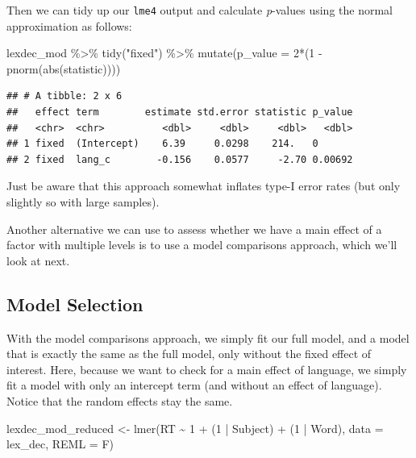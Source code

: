 \documentclass[
]{book}
\newenvironment{Shaded}{\begin{snugshade}}{\end{snugshade}}
\newcommand{\AttributeTok}[1]{\textcolor[rgb]{0.77,0.63,0.00}{#1}}
\newcommand{\DecValTok}[1]{\textcolor[rgb]{0.00,0.00,0.81}{#1}}
\newcommand{\FunctionTok}[1]{\textcolor[rgb]{0.00,0.00,0.00}{#1}}
\newcommand{\NormalTok}[1]{#1}
\newcommand{\OtherTok}[1]{\textcolor[rgb]{0.56,0.35,0.01}{#1}}
\newcommand{\SpecialCharTok}[1]{\textcolor[rgb]{0.00,0.00,0.00}{#1}}
\newcommand{\StringTok}[1]{\textcolor[rgb]{0.31,0.60,0.02}{#1}}
\begin{document}
Then we can tidy up our \texttt{lme4} output and calculate \emph{p}-values using the normal approximation as follows:

\begin{Shaded}
\begin{Highlighting}[]
\NormalTok{lexdec\_mod }\SpecialCharTok{\%\textgreater{}\%} 
  \FunctionTok{tidy}\NormalTok{(}\StringTok{"fixed"}\NormalTok{) }\SpecialCharTok{\%\textgreater{}\%} 
  \FunctionTok{mutate}\NormalTok{(}\AttributeTok{p\_value =} \DecValTok{2}\SpecialCharTok{*}\NormalTok{(}\DecValTok{1} \SpecialCharTok{{-}} \FunctionTok{pnorm}\NormalTok{(}\FunctionTok{abs}\NormalTok{(statistic))))}
\end{Highlighting}
\end{Shaded}

\begin{verbatim}
## # A tibble: 2 x 6
##   effect term        estimate std.error statistic p_value
##   <chr>  <chr>          <dbl>     <dbl>     <dbl>   <dbl>
## 1 fixed  (Intercept)    6.39     0.0298    214.   0      
## 2 fixed  lang_c        -0.156    0.0577     -2.70 0.00692
\end{verbatim}

Just be aware that this approach somewhat inflates type-I error rates (but only slightly so with large samples).

Another alternative we can use to assess whether we have a main effect of a factor with multiple levels is to use a model comparisons approach, which we'll look at next.

\hypertarget{model-selection}{%
\subsection{Model Selection}\label{model-selection}}

With the model comparisons approach, we simply fit our full model, and a model that is exactly the same as the full model, only without the fixed effect of interest. Here, because we want to check for a main effect of language, we simply fit a model with only an intercept term (and without an effect of language). Notice that the random effects stay the same.

\begin{Shaded}
\begin{Highlighting}[]
\NormalTok{lexdec\_mod\_reduced }\OtherTok{\textless{}{-}} \FunctionTok{lmer}\NormalTok{(RT }\SpecialCharTok{\textasciitilde{}} \DecValTok{1} \SpecialCharTok{+}\NormalTok{ (}\DecValTok{1} \SpecialCharTok{|}\NormalTok{ Subject) }\SpecialCharTok{+}\NormalTok{ (}\DecValTok{1} \SpecialCharTok{|}\NormalTok{ Word), }\AttributeTok{data =}\NormalTok{ lex\_dec, }\AttributeTok{REML =}\NormalTok{ F)}
\end{Highlighting}
\end{Shaded}
\end{document}
